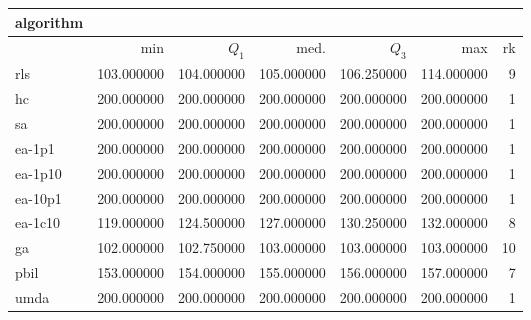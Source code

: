 \begin{tabular}{@{}l*{5}{>{{}}N{3}{0}}>{{}}N{2}{0}@{}}
\toprule
{algorithm} &  \\
\midrule
& {min} & {$Q_1$} & {med.} & {$Q_3$} & {max} & {rk}\\
\midrule
rls & 103.000000 & 104.000000 & 105.000000 & 106.250000 & 114.000000 & 9\\
hc & {\color{blue}} 200.000000 & {\color{blue}} 200.000000 & {\color{blue}} 200.000000 & {\color{blue}} 200.000000 & {\color{blue}} 200.000000 & 1\\
sa & {\color{blue}} 200.000000 & {\color{blue}} 200.000000 & {\color{blue}} 200.000000 & {\color{blue}} 200.000000 & {\color{blue}} 200.000000 & 1\\
ea-1p1 & {\color{blue}} 200.000000 & {\color{blue}} 200.000000 & {\color{blue}} 200.000000 & {\color{blue}} 200.000000 & {\color{blue}} 200.000000 & 1\\
ea-1p10 & {\color{blue}} 200.000000 & {\color{blue}} 200.000000 & {\color{blue}} 200.000000 & {\color{blue}} 200.000000 & {\color{blue}} 200.000000 & 1\\
ea-10p1 & {\color{blue}} 200.000000 & {\color{blue}} 200.000000 & {\color{blue}} 200.000000 & {\color{blue}} 200.000000 & {\color{blue}} 200.000000 & 1\\
ea-1c10 & 119.000000 & 124.500000 & 127.000000 & 130.250000 & 132.000000 & 8\\
ga & 102.000000 & 102.750000 & 103.000000 & 103.000000 & 103.000000 & 10\\
pbil & 153.000000 & 154.000000 & 155.000000 & 156.000000 & 157.000000 & 7\\
umda & {\color{blue}} 200.000000 & {\color{blue}} 200.000000 & {\color{blue}} 200.000000 & {\color{blue}} 200.000000 & {\color{blue}} 200.000000 & 1\\
\bottomrule
\end{tabular}
